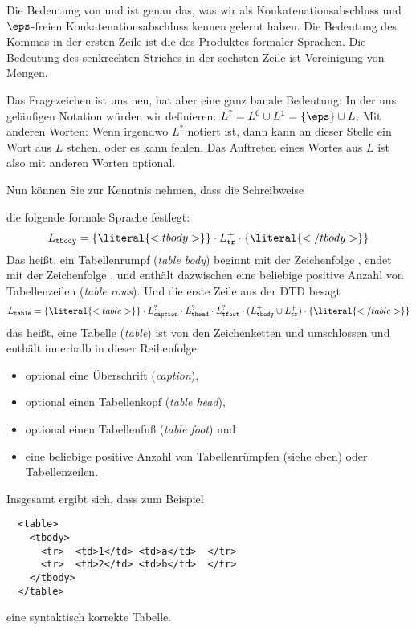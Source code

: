 Die Bedeutung von \literal{*} und \literal{+} ist genau das, was wir als
Konkatenationsabschluss und $\eps$-freien Konkatenationsabschluss kennen
gelernt haben. Die Bedeutung des Kommas \literal{,} in der ersten Zeile ist
die des Produktes formaler Sprachen. Die Bedeutung des senkrechten Striches
\literal{|} in der sechsten Zeile ist Vereinigung von Mengen.

Das Fragezeichen ist uns neu, hat aber eine ganz banale Bedeutung: In der uns
geläufigen Notation würden wir definieren: $L^? = L^0\cup L^1 = \{\eps\} \cup
L$. Mit anderen Worten: Wenn irgendwo $L^?$ notiert ist, dann kann an dieser
Stelle ein Wort aus $L$ stehen, oder es kann fehlen. Das Auftreten eines
Wortes aus $L$ ist also mit anderen Worten optional.

Nun können Sie zur Kenntnis nehmen, dass \zB die Schreibweise

\qquad \qquad {} 

\noindent
die folgende formale Sprache festlegt:
\[
L_{\mathtt{tbody}} = \{\literal{<tbody>}\}\cdot
L_{\mathtt{tr}}^+\cdot\{\literal{</tbody>}\}
\]
Das heißt, ein Tabellenrumpf (\emph{table body}) beginnt mit der
Zeichenfolge , endet mit der Zeichenfolge
, und enthält dazwischen eine beliebige positive
Anzahl von Tabellenzeilen (\emph{table rows}). Und die erste Zeile aus
der DTD besagt
\[
L_{\mathtt{table}} = \{\literal{<table>}\}\cdot
L_{\mathtt{caption}}^?\cdot L_{\mathtt{thead}}^?\cdot
L_{\mathtt{tfo{}ot}}^?\cdot (L_{\mathtt{tbody}}^+ \cup L_{\mathtt{tr}}^+)\cdot
\{\literal{</table>}\}
\]
das heißt, eine Tabelle (\emph{table}) ist von den Zeichenketten
 und  umschlossen und enthält
innerhalb in dieser Reihenfolge
%
\begin{itemize}
\item optional eine Überschrift (\emph{caption}),
\item optional einen Tabellenkopf (\emph{table head}),
\item optional einen Tabellenfuß (\emph{table foot}) und
\item eine beliebige positive Anzahl von Tabellenrümpfen (siehe eben) oder
  Tabellenzeilen.
\end{itemize}
%
Insgesamt ergibt sich, dass zum Beispiel
\begin{verbatim}
  <table>
    <tbody>
      <tr>  <td>1</td> <td>a</td>  </tr>
      <tr>  <td>2</td> <td>b</td>  </tr>
    </tbody>
  </table>
\end{verbatim}
eine syntaktisch korrekte Tabelle.

